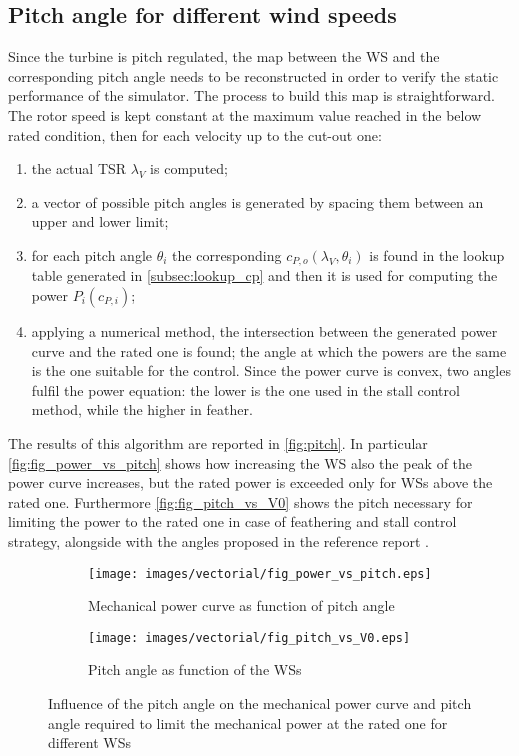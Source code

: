 \subsection{Pitch angle for different wind speeds}\label{subsec:pitch_map}
Since the turbine is pitch regulated, the map between the \acrshort{WS} and the corresponding pitch angle needs to be reconstructed in order to verify the static performance of the simulator. The process to build this map is straightforward. The rotor speed is kept constant at the maximum value reached in the below rated condition, then for each velocity up to the cut-out one:
\begin{enumerate}
    \item  the actual \acrshort{TSR} $\lambda_V$ is computed;
    \item a vector of possible pitch angles is generated by spacing them between an upper and lower limit;
    \item for each pitch angle $\theta_i$ the corresponding $c_{P,o}(\lambda_V, \theta_i)$ is found in the lookup table generated in \autoref{subsec:lookup_cp} and then it is used for computing the power $P_i(c_{P,i})$;
    \item applying a numerical method, the intersection between the generated power curve and the rated one is found; the angle at which the powers are the same is the one suitable for the control. Since the power curve is convex, two angles fulfil the power equation: the lower is the one used in the stall control method, while the higher in feather.
\end{enumerate}
The results of this algorithm are reported in \autoref{fig:pitch}. In particular \autoref{fig:fig_power_vs_pitch} shows how increasing the \acrshort{WS} also the peak of the power curve increases, but the rated power is exceeded only for \acrshort{WSs} above the rated one. Furthermore \autoref{fig:fig_pitch_vs_V0} shows the pitch necessary for limiting the power to the rated one in case of feathering and stall control strategy, alongside with the angles proposed in the reference report \cite{DTU_Wind_Energy_Report-I-0092}. 
\begin{figure}[htb]
    \centering
    \begin{subfigure}{0.49\textwidth}
    \centering
    \texttt{[image: images/vectorial/fig\_power\_vs\_pitch.eps]}
    \caption{Mechanical power curve as function of pitch angle}
    \label{fig:fig_power_vs_pitch}
    \end{subfigure}
    \begin{subfigure}{0.49\textwidth}
    \texttt{[image: images/vectorial/fig\_pitch\_vs\_V0.eps]}
    \caption{Pitch angle as function of the \acrshort{WSs}}
    \label{fig:fig_pitch_vs_V0}
    \end{subfigure}
    \caption{Influence of the pitch angle on the mechanical power curve and pitch angle required to limit the mechanical power at the rated one for different \acrshort{WSs}}
    \label{fig:pitch}
\end{figure}

